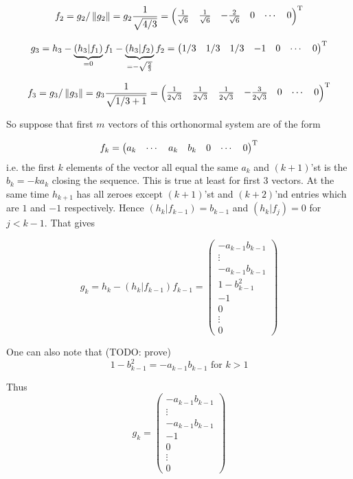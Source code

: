\documentclass{article}
\begin{document}
        \[f_2 = g_2/\left\|{g_2}\right\| =
g_2 \frac{1}{\sqrt{4/3}} =
\begin{pmatrix} \frac1{\sqrt6} & \frac1{\sqrt6} & - \frac2{\sqrt6} & 0 & \cdots & 0 \end{pmatrix}^{\mathrm{T}}\]

    \[g_3 =
h_3 - \underbrace{\left(h_3|f_1\right)}_{=0}f_1
    - \underbrace{\left(h_3|f_2\right)}_{=-\sqrt{\frac23}}f_2
= \begin{pmatrix} 1/3 & 1/3 & 1/3 & -1 & 0 & \cdots & 0 \end{pmatrix}^{\mathrm{T}}\]

    \[f_3 = g_3 / \left\|{g_3}\right\| = g_3 \frac{1}{\sqrt{1/3 + 1}} =
\begin{pmatrix}
    \frac{1}{2\sqrt3} & \frac{1}{2\sqrt3} &
    \frac{1}{2\sqrt3} & - \frac{3}{2\sqrt3} &
    0 & \cdots & 0
\end{pmatrix}^{\mathrm{T}}\]

So suppose that first \( m \) vectors of this orthonormal system
are of the form

\[ f_k =
\begin{pmatrix}
    a_k & \cdots & a_k & b_k & 0 & \cdots & 0
\end{pmatrix}^{\mathrm{T}}\]
i.e. the first \( k \) elements of the vector all equal the same \( a_k \)
and \( (k+1) \)'st is the \( b_k = -ka_k \) closing the sequence.
This is true at least for first 3 vectors.
At the same time \( h_{k+1} \) has all zeroes
except \( (k+1) \)'st and \( (k+2) \)'nd entries which are \( 1 \) and \( -1 \) respectively.
Hence \( \left(h_k|f_{k-1}\right) = b_{k-1} \) and \( \left(h_k|f_j\right) = 0 \) for \( j < k-1 \).
That gives

\[g_k = h_k - \left(h_k|f_{k-1}\right) f_{k-1} =
\begin{pmatrix}
    - a_{k-1} b_{k-1} \\
    \vdots \\
    - a_{k-1} b_{k-1} \\
    1 - b_{k-1}^2     \\
    -1 \\
    0 \\
    \vdots \\
    0
\end{pmatrix}\]

One can also note that (TODO: prove)
\[1 - b_{k-1}^2 = - a_{k-1} b_{k-1} \text{ for } k>1\]

Thus
\[g_k =
\begin{pmatrix}
    - a_{k-1} b_{k-1} \\
    \vdots \\
    - a_{k-1} b_{k-1} \\
    -1 \\
    0 \\
    \vdots \\
    0
\end{pmatrix}\]
\end{document}
